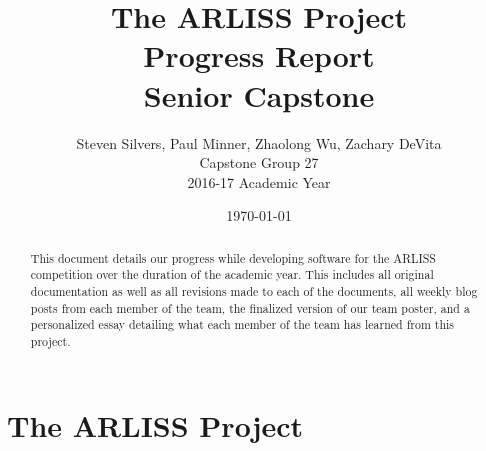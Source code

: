 \documentclass[10pt,letterpaper,onecolumn,draftclsnofoot,journal]{IEEEtran}
\begin{document}
\begin{titlepage}
	\title{The ARLISS Project\\Progress Report\\Senior Capstone}
	\author{Steven Silvers, Paul Minner, Zhaolong Wu, Zachary DeVita\\
		Capstone Group 27\\2016-17 Academic Year}
	\date{\today}
	\maketitle
	\vspace{4cm}
	\begin{abstract}
		\noindent This document details our progress while developing software for the ARLISS competition over the duration of the academic year. This includes all original documentation as well as all revisions made to each of the documents, all weekly blog posts from each member of the team, the finalized version of our team poster, and a personalized essay detailing what each member of the team has learned from this project.
	\end{abstract}

\end{titlepage}
\begingroup
  \flushbottom
  \setlength{\parskip}{0pt plus .1fil}%
  \tableofcontents
  \newpage
\endgroup

\section{\textbf{The ARLISS Project}}
\end{document}
